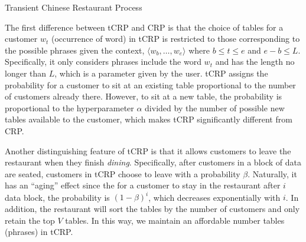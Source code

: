 \begin{algorithm}[h!]
\caption{Transient Chinese Restaurant Process}\label{alg::tcrp}
  \SetAlgoNoLine
\end{algorithm}

The first difference between tCRP and CRP is that the choice of tables for a
customer $w_t$ (occurrence of word) in tCRP is restricted to those corresponding
to the possible phrases given the context, $\langle w_b, \dots, w_e \rangle$
where $b \le t \le e$ and $e - b \le L$. Specifically, it only considers phrases
include the word $w_t$ and has the length no longer than $L$, which is a
parameter given by the user.  tCRP assigns the probability for a customer to sit
at an existing table proportional to the number of customers already there.
However, to sit at a new table, the probability is proportional to the
hyperparameter $\alpha$ divided by the number of possible new tables available
to the customer, which makes tCRP significantly different from CRP.

Another distinguishing feature of tCRP is that it allows customers to leave the
restaurant when they finish \emph{dining}. Specifically, after customers in a
block of data are seated, customers in tCRP choose to leave with a probability
$\beta$. Naturally, it has an ``aging'' effect since the for a customer to stay
in the restaurant after $i$ data block, the probability is $(1 - \beta)^i$,
which decreases exponentially with $i$. In addition, the restaurant will sort
the tables by the number of customers and only retain the top $V$ tables. In
this way, we maintain an affordable number tables (phrases) in tCRP.

